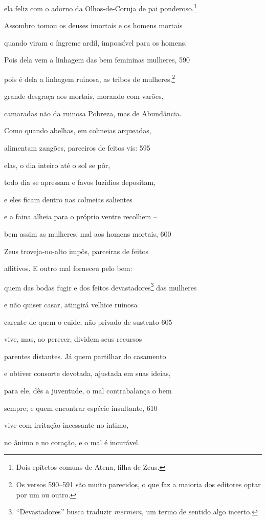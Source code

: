 ela feliz com o adorno da Olhos-de-Coruja de pai ponderoso.\footnote{Dois epítetos comuns de Atena, filha de Zeus.}

Assombro tomou os deuses imortais e os homens mortais

quando viram o íngreme ardil, impossível para os homens.

Pois dela vem a linhagem das bem femininas mulheres, \num{590}

pois é dela a linhagem ruinosa, as tribos de mulheres,\footnote{Os versos 590--591 são muito parecidos, o que faz a maioria dos editores optar
por um ou outro.}

grande desgraça aos mortais, morando com varões,

camaradas não da ruinosa Pobreza, mas de Abundância.

Como quando abelhas, em colmeias arqueadas,

alimentam zangões, parceiros de feitos vis: \num{595}

elas, o dia inteiro até o sol se pôr,

todo dia se apressam e favos luzidios depositam,

e eles ficam dentro nas colmeias salientes

e a faina alheia para o próprio ventre recolhem --

bem assim as mulheres, mal aos homens mortais, \num{600}

Zeus troveja-no-alto impôs, parceiras de feitos

aflitivos. E outro mal forneceu pelo bem:

quem das bodas fugir e dos feitos devastadores\footnote{``Devastadores'' busca traduzir \emph{mermera}, um termo de sentido algo incerto.} das mulheres

e não quiser casar, atingirá velhice ruinosa

carente de quem o cuide; não privado de sustento \num{605}

vive, mas, ao perecer, dividem seus recursos

parentes distantes. Já quem partilhar do casamento

e obtiver consorte devotada, ajustada em suas ideias,

para ele, dês a juventude, o mal contrabalança o bem

sempre; e quem encontrar espécie insultante, \num{610}

vive com irritação incessante no íntimo,

no ânimo e no coração, e o mal é incurável.

